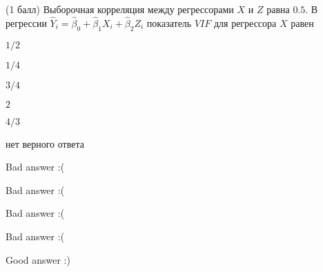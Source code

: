 
\begin{question}
(1 балл) Выборочная корреляция между регрессорами \(X\) и \(Z\) равна \(0.5\). В
регрессии \(\hat Y_i = \hat\beta_0 + \hat\beta_1 X_i + \hat\beta_2 Z_i\)
показатель \(VIF\) для регрессора \(X\) равен
\begin{answerlist}
  \item \(1/2\)
  \item \(1/4\)
  \item \(3/4\)
  \item \(2\)
  \item \(4/3\)
  \item нет верного ответа
\end{answerlist}
\end{question}

\begin{solution}
\begin{answerlist}
  \item Bad answer :(
  \item Bad answer :(
  \item Bad answer :(
  \item Bad answer :(
  \item Good answer :)
\end{answerlist}
\end{solution}
